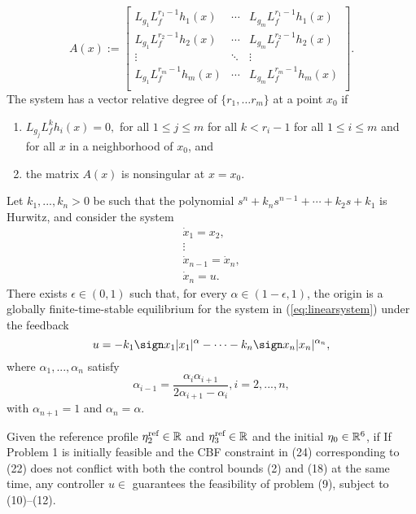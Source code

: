 {{\begin{definition}
\begin{equation*}
\label{eq:matix_vector_relative_degree}
 A(x):=
  \left[
  \begin{array}{ccc}
      L_{g_1}L_{f}^{r_1 -1}h_1(x)& \cdots & L_{g_m}L_{f}^{r_1 -1}h_1(x)\\
      L_{g_1}L_{f}^{r_2 -1}h_2(x)& \cdots & L_{g_m}L_{f}^{r_2 -1}h_2(x)\\
      \vdots & \ddots & \vdots \\
      L_{g_1}L_{f}^{r_m -1}h_m(x)& \cdots & L_{g_m}L_{f}^{r_m -1}h_m(x)\\
  \end{array} \right].
\end{equation*}
%
The system has a vector relative degree of $\{r_1, \dots r_m \}$ at a point $x_0$ if
\begin{enumerate}
  \item $L_{g_j} L_f ^k h_i(x)=0,$ for all $1\leq j \leq m $ for all $ k<r_i-1$ for all $1\leq i \leq m$ and for all $x$ in a neighborhood of $x_0$, and
  \item  the matrix $A(x)$ is nonsingular at $x=x_0$.
\end{enumerate}
\end{definition}}

\begin{proposition}\label{prop:linearfinitetime}
Let $k_1,..., k_{n} > 0$ be such that the polynomial $s^n + k_ns^{n-1} + \cdots + k_{2}s + k_{1}$ is Hurwitz, and consider the system
\begin{equation}\label{eq:linearsystem}
    \begin{aligned}
    \dot{x}_{1} = x_{2},\\
    \vdots\\
    \dot{x}_{n - 1} = \dot{x}_{n},\\
    \dot{x}_{n} = u.
\end{aligned}
\end{equation}
There exists $\epsilon\in (0, 1)$ such that, for every $\alpha\in (1 - \epsilon, 1)$, the origin is a globally finite-time-stable equilibrium for the system in (\ref{eq:linearsystem}) under the feedback
$$
u = -k_1 \sign x_{1} |x_{1}|^{\alpha} - \cdots - k_{n}\sign x_{n} |x_{n}|^{\alpha_{n}},
$$
where $\alpha_{1},..., \alpha_{n} $ satisfy
\begin{equation}\label{eq:xicontrol}
    \alpha_{i - 1} = \frac{\alpha_{i}\alpha_{i + 1}}{2\alpha_{i + 1}- \alpha_{i}}, i = 2, ..., n,
\end{equation}
with $\alpha_{n + 1} = 1$ and $\alpha_{n} = \alpha$.
\end{proposition}
\begin{theorem}
    Given the reference profile $\eta_{2}^{\text{ref}}\in \mathbb{R}$ and $\eta_{3}^{\text{ref}}\in \mathbb{R}$ and the initial $\eta_{0}\in \mathbb{R}^{6}$, if  If Problem 1 is initially feasible and the CBF constraint
in (24) corresponding to (22) does not conflict with both the control
bounds (2) and (18) at the same time, any controller $u\in$
guarantees the feasibility of problem (9), subject to (10)–(12).
\end{theorem}}